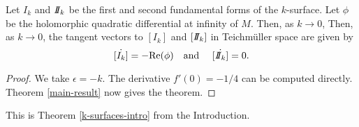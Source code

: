 \begin{thm} \label{labourie-conjecture-proof}
Let $I_k$ and $I\!\!I_k$ be the first and second fundamental forms of the $k$-surface. 
Let $\phi$ be the holomorphic quadratic differential at infinity of $M$. 
Then, as $k \to 0$, Then, as $k \to 0$, the tangent vectors to $[I_k]$ and $[I\!\!I_k]$ in Teichm\"uller space are given by 
\[
\dot{[I_k]} = - \mathrm{Re}(\phi) \quad \text{and } \quad   \dot{[I\!\!I_k]} = 0.
\]
\end{thm}

\begin{proof}
We take $\epsilon = -k$. 
The derivative $f'(0) = -1/4$ can be computed directly. 
Theorem \ref{main-result} now gives the theorem.
\end{proof}
This is Theorem \ref{k-surfaces-intro} from the Introduction.